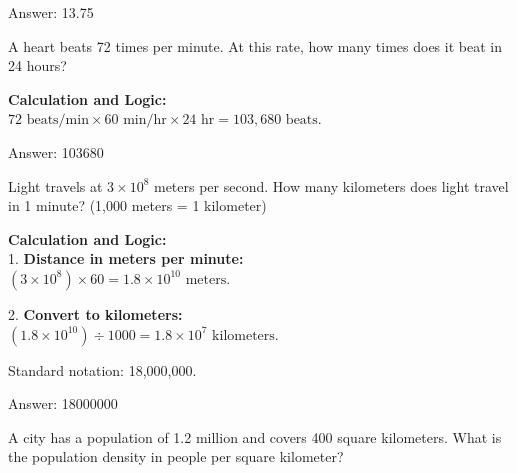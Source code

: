 \documentclass[11pt,paper=a4,answers]{exam}
\begin{document}
\begin{questions}
\begin{solution}
\vspace{30pt}

Answer: \colorbox{yellow!100}{13.75}
\end{solution}

\vspace{60pt}

\question
A heart beats 72 times per minute. At this rate, how many times does it beat in 24 hours?

\begin{solution}
\textbf{Calculation and Logic:} \\
$72 \text{ beats/min} \times 60 \text{ min/hr} \times 24 \text{ hr} = 103,680 \text{ beats}$.

\vspace{30pt}

Answer: \colorbox{yellow!100}{103680}
\end{solution}

\vspace{60pt}

\question
Light travels at $3 \times 10^8$ meters per second. How many kilometers does light travel in 1 minute? (1,000 meters = 1 kilometer)

\begin{solution}
\textbf{Calculation and Logic:} \\
1. \textbf{Distance in meters per minute:} \\
$(3 \times 10^8) \times 60 = 1.8 \times 10^{10} \text{ meters}$.

\vspace{15pt}

2. \textbf{Convert to kilometers:} \\
$(1.8 \times 10^{10}) \div 1000 = 1.8 \times 10^7 \text{ kilometers}$.

\vspace{15pt}

Standard notation: 18,000,000.

\vspace{30pt}

Answer: \colorbox{yellow!100}{18000000}
\end{solution}

\vspace{60pt}

\question
A city has a population of 1.2 million and covers 400 square kilometers. What is the population density in people per square kilometer?


\end{questions}
\end{document}
